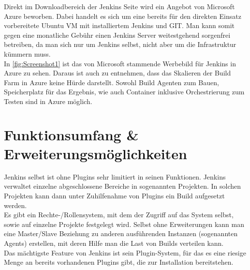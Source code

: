 Direkt im Downloadbereich der Jenkins Seite wird ein Angebot von Microsoft Azure beworben. Dabei handelt es sich um eine bereits für den direkten Einsatz vorbereitete Ubuntu VM mit installiertem Jenkins und GIT. Man kann somit gegen eine monatliche Gebühr einen Jenkins Server weitestgehend sorgenfrei betreiben, da man sich nur um Jenkins selbst, nicht aber um die Infrastruktur kümmern muss. \cite{jenkins-azure}\\
In \autoref{fig:Screenshot1} ist das von Microsoft stammende Werbebild für Jenkins in Azure zu sehen. Daraus ist auch zu entnehmen, dass das Skalieren der Build Farm in Azure keine Hürde darstellt. Sowohl Build Agenten zum Bauen, Speicherplatz für das Ergebnis, wie auch Container inklusive Orchestrierung zum Testen sind in Azure möglich.
\section{Funktionsumfang \& Erweiterungsmöglichkeiten}
Jenkins selbst ist ohne Plugins sehr limitiert in seinen Funktionen. Jenkins verwaltet einzelne abgeschlossene Bereiche in sogenannten Projekten. In solchen Projekten kann dann unter Zuhilfenahme von Plugins ein Build aufgesetzt werden.\\
Es gibt ein Rechte-/Rollensystem, mit dem der Zugriff auf das System selbst, sowie auf einzelne Projekte festgelegt wird. Selbst ohne Erweiterungen kann man eine Master/Slave Beziehung zu anderen ausführenden Instanzen (sogenannten Agents) erstellen, mit deren Hilfe man die Last von Builds verteilen kann.\\
Das mächtigste Feature von Jenkins ist sein Plugin-System, für das es eine riesige Menge an bereits vorhandenen Plugins gibt, die zur Installation bereitstehen.

